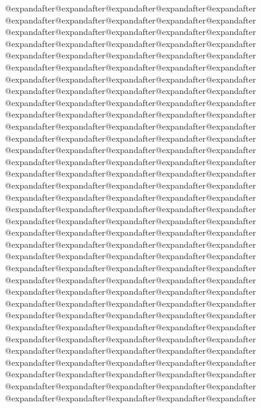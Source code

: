 {{                @expandafter@expandafter@expandafter@expandafter@expandafter%
                @expandafter@expandafter@expandafter@expandafter@expandafter%
                @expandafter@expandafter@expandafter@expandafter@expandafter%
                @expandafter@expandafter@expandafter@expandafter@expandafter%
                @expandafter@expandafter@expandafter@expandafter@expandafter%
                @expandafter@expandafter@expandafter@expandafter@expandafter%
                @expandafter@expandafter@expandafter@expandafter@expandafter%
                @expandafter@expandafter@expandafter@expandafter@expandafter%
                @expandafter@expandafter@expandafter@expandafter@expandafter%
                @expandafter@expandafter@expandafter@expandafter@expandafter%
                @expandafter@expandafter@expandafter@expandafter@expandafter%
                @expandafter@expandafter@expandafter@expandafter@expandafter%
                @expandafter@expandafter@expandafter@expandafter@expandafter%
                @expandafter@expandafter@expandafter@expandafter@expandafter%
                @expandafter@expandafter@expandafter@expandafter@expandafter%
                @expandafter@expandafter@expandafter@expandafter@expandafter%
                @expandafter@expandafter@expandafter@expandafter@expandafter%
                @expandafter@expandafter@expandafter@expandafter@expandafter%
                @expandafter@expandafter@expandafter@expandafter@expandafter%
                @expandafter@expandafter@expandafter@expandafter@expandafter%
                @expandafter@expandafter@expandafter@expandafter@expandafter%
                @expandafter@expandafter@expandafter@expandafter@expandafter%
                @expandafter@expandafter@expandafter@expandafter@expandafter%
                @expandafter@expandafter@expandafter@expandafter@expandafter%
                @expandafter@expandafter@expandafter@expandafter@expandafter%
                @expandafter@expandafter@expandafter@expandafter@expandafter%
                @expandafter@expandafter@expandafter@expandafter@expandafter%
                @expandafter@expandafter@expandafter@expandafter@expandafter%
                @expandafter@expandafter@expandafter@expandafter@expandafter%
                @expandafter@expandafter@expandafter@expandafter@expandafter%
                @expandafter@expandafter@expandafter@expandafter@expandafter%
                @expandafter@expandafter@expandafter@expandafter@expandafter%
                @expandafter@expandafter@expandafter@expandafter@expandafter%
                @expandafter@expandafter@expandafter@expandafter@expandafter%
}}
